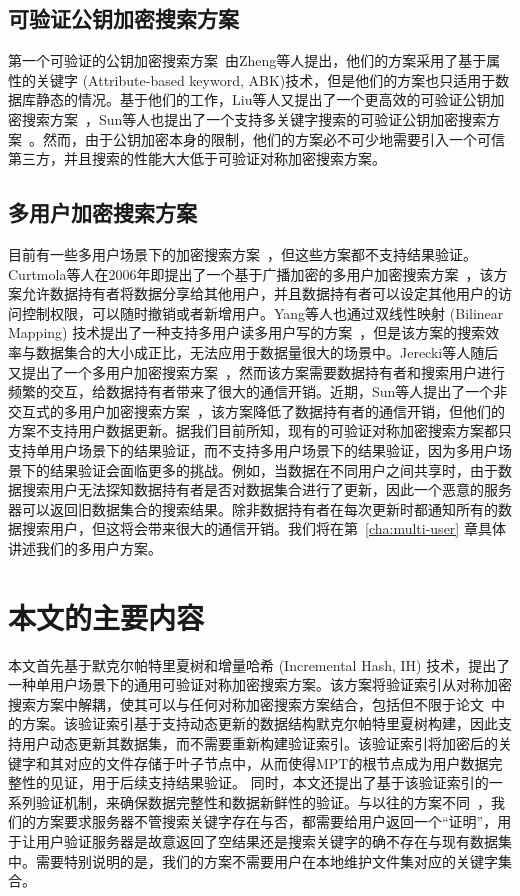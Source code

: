 \subsection{可验证公钥加密搜索方案}
第一个可验证的公钥加密搜索方案~\cite{zheng2014vabks}由Zheng等人提出，他们的方案采用了基于属性的关键字 (Attribute-based keyword, ABK)技术，但是他们的方案也只适用于数据库静态的情况。基于他们的工作，Liu等人又提出了一个更高效的可验证公钥加密搜索方案~\cite{liu2014efficient}，Sun等人也提出了一个支持多关键字搜索的可验证公钥加密搜索方案~\cite{sun2015catch}。然而，由于公钥加密本身的限制，他们的方案必不可少地需要引入一个可信第三方，并且搜索的性能大大低于可验证对称加密搜索方案。

\subsection{多用户加密搜索方案}
目前有一些多用户场景下的加密搜索方案~\cite{curtmola2011searchable,yang2009multiuser,jarecki2013outsourced,sun2016efficient}，但这些方案都不支持结果验证。Curtmola等人在2006年即提出了一个基于广播加密的多用户加密搜索方案~\cite{curtmola2011searchable}，该方案允许数据持有者将数据分享给其他用户，并且数据持有者可以设定其他用户的访问控制权限，可以随时撤销或者新增用户。Yang等人也通过双线性映射 (Bilinear Mapping) 技术提出了一种支持多用户读多用户写的方案~\cite{yang2009multiuser}，但是该方案的搜索效率与数据集合的大小成正比，无法应用于数据量很大的场景中。Jerecki等人随后又提出了一个多用户加密搜索方案~\cite{jarecki2013outsourced}，然而该方案需要数据持有者和搜索用户进行频繁的交互，给数据持有者带来了很大的通信开销。近期，Sun等人提出了一个非交互式的多用户加密搜索方案~\cite{sun2016efficient}，该方案降低了数据持有者的通信开销，但他们的方案不支持用户数据更新。据我们目前所知，现有的可验证对称加密搜索方案都只支持单用户场景下的结果验证，而不支持多用户场景下的结果验证，因为多用户场景下的结果验证会面临更多的挑战。例如，当数据在不同用户之间共享时，由于数据搜索用户无法探知数据持有者是否对数据集合进行了更新，因此一个恶意的服务器可以返回旧数据集合的搜索结果。除非数据持有者在每次更新时都通知所有的数据搜索用户，但这将会带来很大的通信开销。我们将在第~\ref{cha:multi-user} 章具体讲述我们的多用户方案。


\section{本文的主要内容}
本文首先基于默克尔帕特里夏树和增量哈希 (Incremental Hash, IH) 技术，提出了一种单用户场景下的通用可验证对称加密搜索方案。该方案将验证索引从对称加密搜索方案中解耦，使其可以与任何对称加密搜索方案结合，包括但不限于论文~\cite{stefanov2014practical,cash2014dynamic,kamara2012dynamic}中的方案。该验证索引基于支持动态更新的数据结构默克尔帕特里夏树构建，因此支持用户动态更新其数据集，而不需要重新构建验证索引。该验证索引将加密后的关键字和其对应的文件存储于叶子节点中，从而使得MPT的根节点成为用户数据完整性的见证，用于后续支持结果验证。
同时，本文还提出了基于该验证索引的一系列验证机制，来确保数据完整性和数据新鲜性的验证。与以往的方案不同~\cite{kamara2011cs2,kurosawa2013update,stefanov2014practical}，我们的方案要求服务器不管搜索关键字存在与否，都需要给用户返回一个“证明”，用于让用户验证服务器是故意返回了空结果还是搜索关键字的确不存在与现有数据集中。需要特别说明的是，我们的方案不需要用户在本地维护文件集对应的关键字集合。

